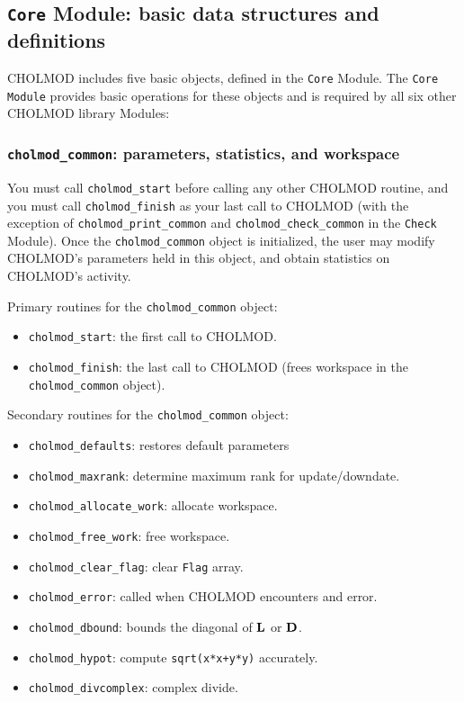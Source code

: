 \documentclass[11pt]{article}
\newcommand{\m}[1]{{\bf{#1}}}       %
\begin{document}
\newpage \subsection{{\tt Core} Module: basic data structures and definitions}

CHOLMOD includes five basic objects, defined in the {\tt Core} Module.
The {\tt Core Module} provides basic operations for these objects
and is required by all six other CHOLMOD library Modules:

\subsubsection{{\tt cholmod\_common}: parameters, statistics, and workspace}
    You must call {\tt cholmod\_start} before calling any other
    CHOLMOD routine, and you must call {\tt cholmod\_finish} as your
    last call to CHOLMOD (with the exception of
    {\tt cholmod\_print\_common} and {\tt cholmod\_check\_common}
    in the {\tt Check} Module).
    Once the {\tt cholmod\_common} object is initialized,
    the user may modify CHOLMOD's parameters held in this object,
    and obtain statistics on CHOLMOD's activity.

\vspace{0.1in}
\noindent Primary routines for the {\tt cholmod\_common} object:
    \begin{itemize}
    \item {\tt cholmod\_start}: the first call to CHOLMOD.
    \item {\tt cholmod\_finish}: the last call to CHOLMOD (frees workspace in the {\tt cholmod\_common} object).
    \end{itemize}

\noindent Secondary routines for the {\tt cholmod\_common} object:
    \begin{itemize}
    \item {\tt cholmod\_defaults}: restores default parameters
    \item {\tt cholmod\_maxrank}: determine maximum rank for update/downdate.
    \item {\tt cholmod\_allocate\_work}: allocate workspace.
    \item {\tt cholmod\_free\_work}: free workspace.
    \item {\tt cholmod\_clear\_flag}: clear {\tt Flag} array.
    \item {\tt cholmod\_error}: called when CHOLMOD encounters and error.
    \item {\tt cholmod\_dbound}: bounds the diagonal of $\m{L}$ or $\m{D}$.
    \item {\tt cholmod\_hypot}: compute {\tt sqrt(x*x+y*y)} accurately.
    \item {\tt cholmod\_divcomplex}: complex divide.
    \end{itemize}
\end{document}

